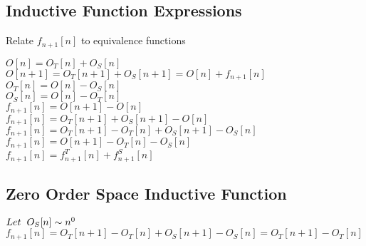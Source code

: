 \documentclass[11pt]{article}
\begin{document}
\subsection{Inductive Function Expressions}
Relate $f_{n+1}[n]$ to equivalence functions
\begin{center}
\vspace{2mm}
$
O[n] = O_T[n] + O_S[n]
$
\\ \vspace{2mm}
$
O[n+1] = O_T[n+1] + O_S[n+1] = O[n] + f_{n+1}[n]
$
\\ \vspace{2mm}
$
O_T[n] = O[n] - O_S[n]
$
\\ \vspace{2mm}
$
O_S[n] = O[n] - O_T[n]
$
\\ \vspace{8mm}
$
f_{n+1}[n] = O[n+1] - O[n]
$
\\ \vspace{2mm}
$
f_{n+1}[n] = O_T[n+1] + O_S[n+1] - O[n]
$
\\ \vspace{2mm}
$
f_{n+1}[n] = O_T[n+1] - O_T[n] + O_S[n+1] - O_S[n]
$
\\ \vspace{2mm}
$
f_{n+1}[n] = O[n+1] - O_T[n] - O_S[n]
$
\\ \vspace{2mm}
$
f_{n+1}[n] =  f^T_{n+1}[n] +  f^S_{n+1}[n]
$
\end{center}






\subsection{Zero Order Space Inductive Function}
\begin{center}
$
Let \hspace{2mm} O_S[n] \sim n^0
$
\\ \vspace{2mm}
$
f_{n+1}[n] = O_T[n+1] - O_T[n] + O_S[n+1] - O_S[n] = O_T[n+1] - O_T[n]
$
\end{center}












\newpage
\end{document}
